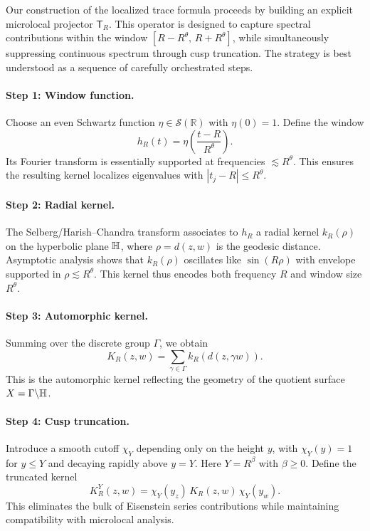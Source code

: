 Our construction of the localized trace formula proceeds by building an explicit
microlocal projector $\mathsf{T}_R$. This operator is designed to capture spectral
contributions within the window $[R-R^\theta,\,R+R^\theta]$, while simultaneously
suppressing continuous spectrum through cusp truncation. The strategy is best understood
as a sequence of carefully orchestrated steps.

\paragraph{Step 1: Window function.}  
Choose an even Schwartz function $\eta \in \mathcal{S}(\mathbb{R})$ with $\eta(0)=1$.
Define the window
\[
  h_R(t) = \eta\!\left(\frac{t-R}{R^\theta}\right).
\]
Its Fourier transform is essentially supported at frequencies $\lesssim R^\theta$. This
ensures the resulting kernel localizes eigenvalues with $|t_j - R|\leq R^\theta$.

\paragraph{Step 2: Radial kernel.}  
The Selberg/Harish–Chandra transform associates to $h_R$ a radial kernel $k_R(\rho)$ on
the hyperbolic plane $\mathbb{H}$, where $\rho = d(z,w)$ is the geodesic distance. Asymptotic
analysis shows that $k_R(\rho)$ oscillates like $\sin(R\rho)$ with envelope supported in
$\rho \lesssim R^\theta$. This kernel thus encodes both frequency $R$ and window size
$R^\theta$.

\paragraph{Step 3: Automorphic kernel.}  
Summing over the discrete group $\Gamma$, we obtain
\[
  K_R(z,w) = \sum_{\gamma \in \Gamma} k_R(d(z,\gamma w)).
\]
This is the automorphic kernel reflecting the geometry of the quotient surface $X =
\Gamma\backslash \mathbb{H}$.

\paragraph{Step 4: Cusp truncation.}  
Introduce a smooth cutoff $\chi_Y$ depending only on the height $y$, with $\chi_Y(y)=1$
for $y \leq Y$ and decaying rapidly above $y=Y$. Here $Y = R^\beta$ with $\beta\geq 0$.
Define the truncated kernel
\[
  K_R^Y(z,w) = \chi_Y(y_z)\, K_R(z,w)\, \chi_Y(y_w).
\]
This eliminates the bulk of Eisenstein series contributions while maintaining
compatibility with microlocal analysis.

